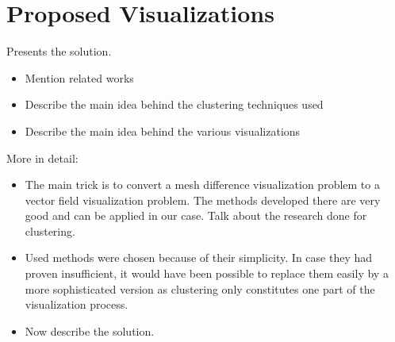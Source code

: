 \chapter{Proposed Visualizations}

Presents the solution.

\begin{itemize}
\item Mention related works
\item Describe the main idea behind the clustering techniques used
\item Describe the main idea behind the various visualizations
\end{itemize}

More in detail:

\begin{itemize}
\item The main trick is to convert a mesh difference visualization problem to a vector field visualization problem. The methods developed there are very good and can be applied in our case. Talk about the research done for clustering.
\item Used methods were chosen because of their simplicity. In case they had proven insufficient, it would have been possible to replace them easily by a more sophisticated version as clustering only constitutes one part of the visualization process.
\item Now describe the solution.
\end{itemize}
